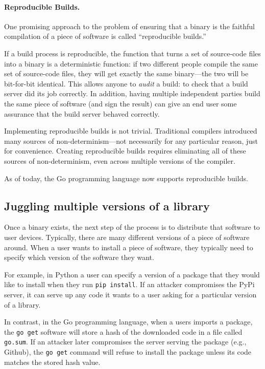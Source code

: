 \paragraph{Reproducible Builds.}
One promising approach to the problem of
ensuring that a binary is the faithful compilation
of a piece of software is called ``reproducible builds.''

If a build process is reproducible, the function that
turns a set of source-code files into a binary is
a deterministic function: if two different people compile
the same set of source-code files, they will get exactly
the same binary---the two will be bit-for-bit identical.
This allows anyone to \emph{audit} a build: to check that
a build server did its job correctly.
In addition, having multiple independent parties build
the same piece of software (and sign the result)
can give an end user some assurance that the build
server behaved correctly.

Implementing reproducible builds is not trivial.
Traditional compilers introduced many sources of 
non-determinism---not necessarily for any particular reason,
just for convenience.
Creating reproducible builds requires eliminating 
all of these sources of non-determinism, even across
multiple versions of the compiler.

As of today, the Go programming language now supports reproducible builds.

\subsection{Juggling multiple versions of a library}
Once a binary exists, the next step of the process
is to distribute that software to user devices.
Typically, there are many different versions of
a piece of software around.
When a user wants to install a piece of software,
they typically need to specify which version of
the software they want.

For example, in Python a user can specify 
a version of a package that they would like to 
install when they run \texttt{pip install}.
If an attacker compromises the PyPi server,
it can serve up any code it wants to a user
asking for a particular version of a library.

In contrast, in the Go programming language, 
when a users imports a package, the \texttt{go get}
software will store a hash of the downloaded code
in a file called \texttt{go.sum}.
If an attacker later compromises the server 
serving the package (e.g., Github), the \texttt{go get}
command will refuse to install the package unless its
code matches the stored hash value.

